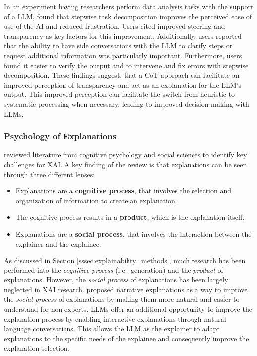 In an experiment having researchers perform data analysis tasks with the support of a \ac{LLM}, \cite{Kazemitabaar2024} found that stepwise task decomposition improves the perceived ease of use of the \ac{AI} and reduced frustration. Users cited improved steering and transparency as key factors for this improvement. Additionally, users reported that the ability to have side conversations with the \ac{LLM} to clarify steps or request additional information was particularly important. Furthermore, users found it easier to verify the output and to intervene and fix errors with stepwise decomposition. These findings suggest, that a \ac{CoT} approach can facilitate an improved perception of transparency and act as an explanation for the \ac{LLM}'s output. This improved perception can facilitate the switch from heuristic to systematic processing when necessary, leading to improved decision-making with \acp{LLM}.

\subsubsection{Psychology of Explanations} \label{sssec:psychology_explanations}

\cite{Miller2019} reviewed literature from cognitive psychology and social sciences to identify key challenges for \ac{XAI}. A key finding of the review is that explanations can be seen through three different lenses:

\begin{itemize}
    \item Explanations are a \textbf{cognitive process}, that involves the selection and organization of information to create an explanation.
    \item The cognitive process results in a \textbf{product}, which is the explanation itself.
    \item Explanations are a \textbf{social process}, that involves the interaction between the explainer and the explainee.
\end{itemize}

As discussed in Section \ref{sssec:explainability_methods}, much research has been performed into the \textit{cognitive process} (i.e., generation) and the \textit{product} of explanations. However, the \textit{social process} of explanations has been largely neglected in \ac{XAI} research. \cite{Martens2025} proposed narrative explanations as a way to improve the \textit{social process} of explanations by making them more natural and easier to understand for non-experts. \acp{LLM} offer an additional opportunity to improve the explanation process by enabling interactive explanations through natural language conversations. This allows the \ac{LLM} as the explainer to adapt explanations to the specific needs of the explainee and consequently improve the explanation selection.

